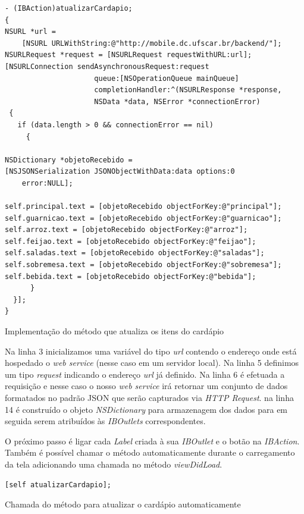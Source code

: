 \documentclass[a4paper,12pt,brazil,oneside]{book}
\begin{document}
\begin{listing}[H]
\begin{verbatim}
- (IBAction)atualizarCardapio;
{
NSURL *url = 
	[NSURL URLWithString:@"http://mobile.dc.ufscar.br/backend/"];
NSURLRequest *request = [NSURLRequest requestWithURL:url];
[NSURLConnection sendAsynchronousRequest:request
                     queue:[NSOperationQueue mainQueue]
                     completionHandler:^(NSURLResponse *response,
                     NSData *data, NSError *connectionError)
 {
   if (data.length > 0 && connectionError == nil)
     {

NSDictionary *objetoRecebido = 
[NSJSONSerialization JSONObjectWithData:data options:0
 	error:NULL];
             
self.principal.text = [objetoRecebido objectForKey:@"principal"];
self.guarnicao.text = [objetoRecebido objectForKey:@"guarnicao"];
self.arroz.text = [objetoRecebido objectForKey:@"arroz"];
self.feijao.text = [objetoRecebido objectForKey:@"feijao"];
self.saladas.text = [objetoRecebido objectForKey:@"saladas"];
self.sobremesa.text = [objetoRecebido objectForKey:@"sobremesa"];
self.bebida.text = [objetoRecebido objectForKey:@"bebida"];
      }
  }];
}
\end{verbatim}
\caption{Implementação do método que atualiza os itens do cardápio}
\end{listing}

Na linha 3 inicializamos uma variável do tipo \emph{url} contendo o endereço onde está hospedado o \emph{web service} (nesse caso em um servidor local). Na linha 5 definimos um tipo \emph{request} indicando o endereço \emph{url} já definido. Na linha 6 é efetuada a requisição e nesse caso o nosso \emph{web service} irá retornar um conjunto de dados formatados no padrão JSON que serão capturados via \emph{HTTP Request}. na linha 14 é construído o objeto \emph{NSDictionary} para armazenagem dos dados para em seguida serem atribuídos às \emph{IBOutlets} correspondentes.

 O próximo passo é ligar cada \emph{Label} criada à sua \emph{IBOutlet} e o botão na \emph{IBAction}. Também é possível chamar o método automaticamente durante o carregamento da tela adicionando uma chamada no método \emph{viewDidLoad}.

\begin{listing}[H]
\begin{verbatim}
[self atualizarCardapio];
\end{verbatim}
\caption{Chamada do método para atualizar o cardápio automaticamente}
\end{listing}
\end{document}
